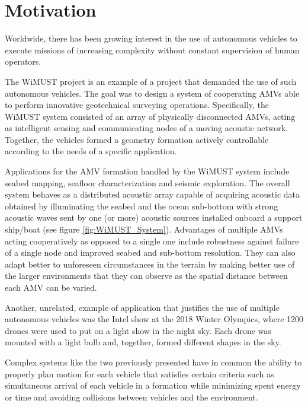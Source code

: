 \cleardoublepage%
\label{chap:intro}%



\section{Motivation}
 

\par Worldwide, there has been growing interest in the use of autonomous vehicles to execute missions of increasing complexity without constant supervision of human operators. 
\par The WiMUST project \cite{sonar_tec_overview} is an example of a project that demanded the use of such autonomous vehicles. The goal was to design a system of cooperating \acp{AMV} able to perform innovative geotechnical surveying operations. Specifically, the WiMUST system consisted of an array of physically disconnected \acp{AMV}, acting as intelligent sensing and communicating nodes of a moving acoustic network. Together, the vehicles formed a geometry formation actively controllable according to the needs of a specific application. 
\par Applications for the \ac{AMV} formation handled by the WiMUST system include seabed mapping, seafloor characterization and seismic exploration. The overall system behaves as a distributed acoustic array capable of acquiring acoustic data obtained by illuminating the seabed and the ocean sub-bottom with strong acoustic waves sent by one (or more) acoustic sources installed onboard a support ship/boat (see figure \ref{fig:WiMUST_System}). Advantages of multiple \acp{AMV} acting cooperatively as opposed to a single one include robustness against failure of a single node and improved seabed and sub-bottom resolution. They can also adapt better to unforeseen circumstances in the terrain by making better use of the larger environments that they can observe as the spatial distance between each \ac{AMV} can be varied. 
\par Another, unrelated, example of application that justifies the use of multiple autonomous vehicles was the Intel show at the 2018 Winter Olympics, where 1200 drones were used to put on a light show in the night sky. Each drone was mounted with a light bulb and, together, formed different shapes in the sky.
\par Complex systems like the two previously presented have in common the ability to properly plan motion for each vehicle that satisfies certain criteria such as simultaneous arrival of each vehicle in a formation while minimizing spent energy or time and avoiding collisions between vehicles and the environment.
